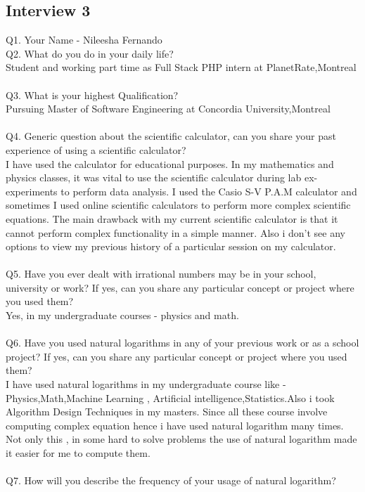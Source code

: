 \documentclass[12pt]{article}
\begin{document}
\subsection{Interview 3}
Q1. Your Name -  Nileesha Fernando\\
Q2. What do you do in your daily life?\\
Student and working part time as Full Stack PHP intern at PlanetRate,Montreal\\\\ 
Q3. What is your highest Qualification?\\
Pursuing Master of Software Engineering at Concordia University,Montreal\\\\
Q4. Generic question about the scientific calculator, can you share your past experience of using a scientific calculator?\\
I have used the calculator for educational purposes. In my mathematics and physics classes, it was vital to use the scientific calculator during lab ex-experiments to perform data analysis. I used the Casio S-V P.A.M calculator and sometimes I used online scientific calculators to perform more complex scientific equations. The main drawback with my current scientific calculator is that it cannot perform complex functionality in a simple manner.
Also i don't see any options to view my previous history of a particular session on my calculator.\\\\
Q5. Have you ever dealt with irrational numbers may be in your school, university or work? If yes, can you share any particular concept or project where you used them?\\
Yes, in my undergraduate courses - physics and math.\\\\
Q6. Have you used natural logarithms in any of your previous work or as a school project? If yes, can you share any particular concept or project where you used them?\\
I have used natural logarithms in my undergraduate course like - Physics,Math,Machine Learning , Artificial intelligence,Statistics.Also i took Algorithm Design Techniques in my masters. Since all these course involve computing complex equation hence i have used natural logarithm many times. Not only this , in some hard to solve problems the use of natural logarithm made it easier for me to compute them.\\\\
Q7. How will you describe the frequency of your usage of natural logarithm?
\end{document}
